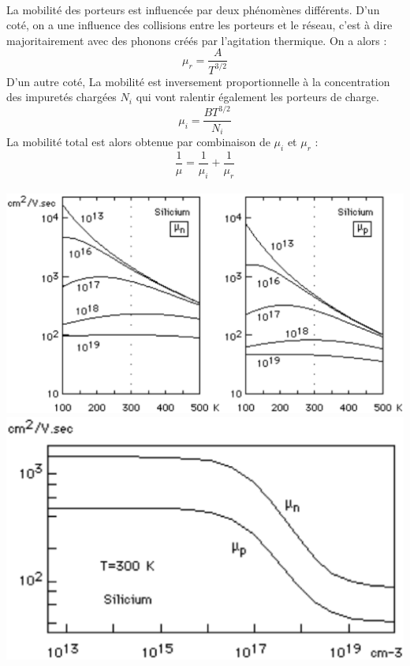 \paragraph*{}
La mobilité des porteurs est influencée par deux phénomènes différents. D'un coté, on a une influence des collisions entre les porteurs et le réseau, c'est à dire majoritairement avec des phonons créés par l'agitation thermique. On a alors :
\begin{equation}
\mu _r=\frac{A}{T^{3/2}}
\end{equation}
D'un autre coté, La mobilité est inversement proportionnelle à la concentration des impuretés chargées $N_i$ qui vont ralentir également les porteurs de charge.
\begin{equation}
\mu _i=\frac{B T^{3/2}}{N_i}
\end{equation}
La mobilité total est alors obtenue par combinaison de $\mu _i$ et $\mu _r$ :
\begin{equation}
\frac{1}{\mu}=\frac{1}{\mu _i}+\frac{1}{\mu _r}
\end{equation}
\\\includegraphics[scale=0.3]{mut.eps} 
\includegraphics[scale=0.3]{muc.eps} 

